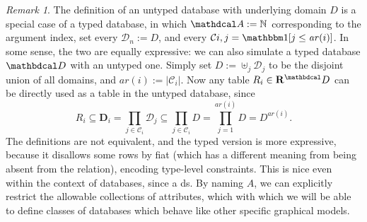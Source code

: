 \documentclass{article}
\theoremstyle{plain}
\theoremstyle{definition}
\theoremstyle{remark}
\newtheorem*{remark}{Remark}
\newcommand\mat[1]{\mathbf{#1}}
\newcommand{\D}{\mathbdcal D} %
\newcommand{\Attrs}{\mathdcal A}
\newcommand{\Doms}{{\mathcal D}}
\newcommand{\Rels}{{\mathbf R}}
\newcommand{\Cols}{\mathcal C}%
\newcommand{\arity}{\mathit{ar}}
\begin{document}

\begin{remark}\label{rem:typed-db-better}
    The definition of an untyped database with underlying domain $D$ is a special case of a typed database, in which $\Attrs := \mathbb N$ corresponding to the argument index, set every $\Doms_n := D $, and every $\Cols{i,j} = \mathbbm1[j \le \arity(i)]$. 
    In some sense, the two are equally expressive: we can also simulate a typed database $\D$ with an untyped one. Simply set $D := \uplus_j \mathcal D_j$ to be the disjoint union of all domains, and $\arity(i) := |\Cols_i|$. Now any table $R_i \in \Rels^\D$ can be directly used as a table in the untyped database, since
    \[R_i \subseteq \mat D_i = \prod_{j \in \Cols_i} \mathcal D_{j} 
		\subseteq \prod_{j \in \Cols_i} D = \prod_{j = 1}^{\arity(i)} D = 
        D^{\arity(i)} .\] 
  	The definitions are not equivalent, and the typed version is more expressive, because it disallows some rows by fiat (which has a different meaning from being absent from the relation), encoding type-level constraints. This is nice even within the context of databases, since a ds. By naming $A$, we can explicitly restrict the  allowable collections of attributes, which with which we will be able to define classes of databases which behave like other specific graphical models.
\end{remark}
\end{document}
